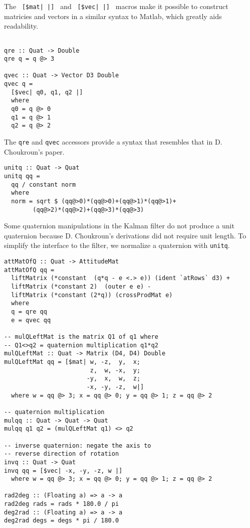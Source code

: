\documentclass[12pt]{report}
\begin{document}
The \lstinline& [$mat| |] & and \lstinline& [$vec| |] & macros make it possible to construct matricies and vectors in a similar syntax to Matlab, which greatly aids readability.

\begin{lstlisting}

qre :: Quat -> Double
qre q = q @> 3

qvec :: Quat -> Vector D3 Double
qvec q = 
  [$vec| q0, q1, q2 |]
  where 
  q0 = q @> 0
  q1 = q @> 1
  q2 = q @> 2

\end{lstlisting}
The \lstinline$qre$ and \lstinline$qvec$ accessors provide a syntax that resembles that in D. Choukroun's paper.
\begin{lstlisting}
unitq :: Quat -> Quat 
unitq qq = 
  qq / constant norm 
  where 
  norm = sqrt $ (qq@>0)*(qq@>0)+(qq@>1)*(qq@>1)+
		(qq@>2)*(qq@>2)+(qq@>3)*(qq@>3)

\end{lstlisting}

Some quaternion manipulations in the Kalman filter do not produce a unit quaternion because D. Choukroun's derivations did not require unit length. To simplify the interface to the filter, we normalize a quaternion with \lstinline$unitq$.

\begin{lstlisting}
attMatOfQ :: Quat -> AttitudeMat
attMatOfQ qq = 
  liftMatrix (*constant  (q*q - e <.> e)) (ident `atRows` d3) + 
  liftMatrix (*constant 2)  (outer e e) -
  liftMatrix (*constant (2*q)) (crossProdMat e)
  where 
  q = qre qq 
  e = qvec qq

-- mulQLeftMat is the matrix Q1 of q1 where 
-- Q1<>q2 = quaternion multiplication q1*q2
mulQLeftMat :: Quat -> Matrix (D4, D4) Double
mulQLeftMat qq = [$mat| w, -z,  y,  x;
                        z,  w, -x,  y;
                       -y,  x,  w,  z;
                       -x, -y, -z,  w|]
  where w = qq @> 3; x = qq @> 0; y = qq @> 1; z = qq @> 2

-- quaternion multiplication
mulqq :: Quat -> Quat -> Quat
mulqq q1 q2 = (mulQLeftMat q1) <> q2

-- inverse quaternion: negate the axis to 
-- reverse direction of rotation
invq :: Quat -> Quat
invq qq = [$vec| -x, -y, -z, w |]
  where w = qq @> 3; x = qq @> 0; y = qq @> 1; z = qq @> 2

rad2deg :: (Floating a) => a -> a
rad2deg rads = rads * 180.0 / pi
deg2rad :: (Floating a) => a -> a
deg2rad degs = degs * pi / 180.0

\end{lstlisting}
\end{document}
